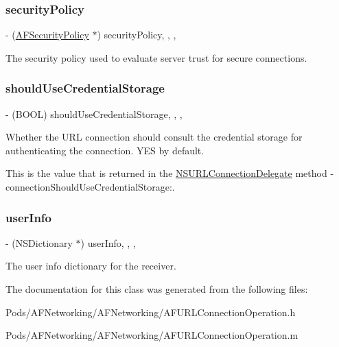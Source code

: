 \subsubsection{\texorpdfstring{security\+Policy}{securityPolicy}}
{\footnotesize\ttfamily -\/ (\mbox{\hyperlink{interface_a_f_security_policy}{A\+F\+Security\+Policy}} $\ast$) security\+Policy\hspace{0.3cm}{\ttfamily [read]}, {\ttfamily [write]}, {\ttfamily [nonatomic]}, {\ttfamily [strong]}}

The security policy used to evaluate server trust for secure connections. \mbox{\label{interface_a_f_u_r_l_connection_operation_a48bd01b0c9afd1f5234d01d28e3764e7}} 
\subsubsection{\texorpdfstring{should\+Use\+Credential\+Storage}{shouldUseCredentialStorage}}
{\footnotesize\ttfamily -\/ (B\+O\+OL) should\+Use\+Credential\+Storage\hspace{0.3cm}{\ttfamily [read]}, {\ttfamily [write]}, {\ttfamily [nonatomic]}, {\ttfamily [assign]}}

Whether the U\+RL connection should consult the credential storage for authenticating the connection. {\ttfamily Y\+ES} by default.

This is the value that is returned in the {\ttfamily \mbox{\hyperlink{class_n_s_u_r_l_connection_delegate-p}{N\+S\+U\+R\+L\+Connection\+Delegate}}} method {\ttfamily -\/connection\+Should\+Use\+Credential\+Storage\+:}. \mbox{\label{interface_a_f_u_r_l_connection_operation_a118c5029a66496f6c9093a4e06d30faf}} 
\subsubsection{\texorpdfstring{user\+Info}{userInfo}}
{\footnotesize\ttfamily -\/ (N\+S\+Dictionary $\ast$) user\+Info\hspace{0.3cm}{\ttfamily [read]}, {\ttfamily [write]}, {\ttfamily [nonatomic]}, {\ttfamily [strong]}}

The user info dictionary for the receiver. 

The documentation for this class was generated from the following files\+:\begin{DoxyCompactItemize}
\item 
Pods/\+A\+F\+Networking/\+A\+F\+Networking/A\+F\+U\+R\+L\+Connection\+Operation.\+h\item 
Pods/\+A\+F\+Networking/\+A\+F\+Networking/A\+F\+U\+R\+L\+Connection\+Operation.\+m\end{DoxyCompactItemize}
